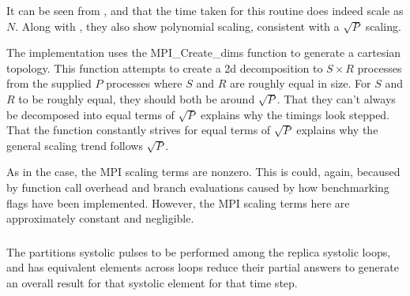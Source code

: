 \vZeroTimeExplanation
    {}
    {}
    {}
    {\individualoperation{}}
    {\replicatedsystolicloop{}}

%
It can be seen from
,
 and
that the time taken for this routine does indeed scale as $N$.
%
Along with 
,
they also show polynomial scaling, consistent with a $\sqrt{P}$ scaling.

The implementation uses the MPI\_Create\_dims function to generate a
cartesian topology.
%
This function attempts to create a 2d decomposition to $S \times{} R$
processes from the supplied $P$ processes where $S$ and $R$ are roughly
equal in size.
%
For $S$ and $R$ to be roughly equal, they should both be around $\sqrt{P}$.
%
That they can't always be decomposed into equal terms of $\sqrt{P}$
explains why the timings look stepped.
%
That the function constantly strives for equal terms of $\sqrt{P}$
explains why the general scaling trend follows $\sqrt{P}$.

As in the \systolicloop{} case, the MPI scaling terms are nonzero.
%
This is could, again, becaused by function call overhead and
branch evaluations caused by how benchmarking flags have been implemented.
%
However, the MPI scaling terms here are approximately constant and negligible.


\subsubsection{\pairoperation{}}

The \pairoperation{} partitions systolic pulses to be performed among
the replica systolic loops, and has equivalent elements across loops
reduce their partial answers to generate an overall result for that
systolic element for that time step.

%
%
\begin{figure}[!h]
    
    \caption{
        \vZeroSpeedupCaption
            {\replicatedsystolicloop{}}
            {\pairoperation{}}
    }
    \label{fig:v1_replicated_systolic_pair_operation_speedups}
\end{figure}


